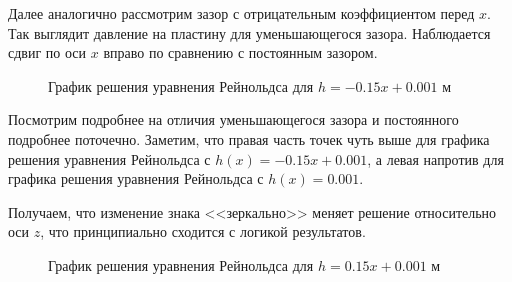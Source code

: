 \documentclass[a4paper,14pt]{extarticle}
\begin{document}
Далее аналогично рассмотрим зазор с отрицательным коэффициентом перед $x$. Так выглядит давление на пластину для уменьшающегося зазора. Наблюдается сдвиг по оси $x$ вправо по сравнению с постоянным зазором.

\begin{figure}[!htbp]
	\caption{График решения уравнения Рейнольдса для $h = -0.15 x + 0.001$ м}
	\label{res_neg}
\end{figure}

Посмотрим подробнее на отличия уменьшающегося зазора и постоянного подробнее поточечно. Заметим, что правая часть точек чуть выше для графика решения уравнения Рейнольдса с  $h(x) = -0.15x + 0.001$, а левая напротив для графика решения уравнения Рейнольдса с $h(x) = 0.001$.

Получаем, что изменение знака <<зеркально>> меняет решение относительно оси $z$, что принципиально сходится с логикой результатов.

\begin{figure}[!htbp]
	\caption{График решения уравнения Рейнольдса для $h = 0.15 x + 0.001$ м}
	\label{neg_res_diff}
\end{figure}
\end{document}
